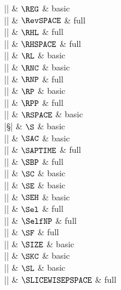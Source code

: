 |\REG|    & $\REG$ & basic \\

|\RevSPACE|    & $\RevSPACE$ & full \\

|\RHL|    & $\RHL$ & full \\

|\RHSPACE|    & $\RHSPACE$ & full \\

|\RL|    & $\RL$ & basic \\

|\RNC|    & $\RNC$ & basic \\

|\RNP|    & $\RNP$ & full \\

|\RP|    & $\RP$ & basic \\

|\RPP|    & $\RPP$ & full \\

|\RSPACE|    & $\RSPACE$ & basic \\

|\S|    & $\S$ & basic \\

|\SAC|    & $\SAC$ & basic \\

|\SAPTIME|    & $\SAPTIME$ & full \\

|\SBP|    & $\SBP$ & full \\

|\SC|    & $\SC$ & basic \\

|\SE|    & $\SE$ & basic \\

|\SEH|    & $\SEH$ & basic \\

|\Sel|    & $\Sel$ & full \\

|\SelfNP|    & $\SelfNP$ & full \\

|\SF|    & $\SF$ & full \\

|\SIZE|    & $\SIZE$ & basic \\

|\SKC|    & $\SKC$ & basic \\

|\SL|    & $\SL$ & basic \\

|\SLICEWISEPSPACE|    & $\SLICEWISEPSPACE$ & full \\

